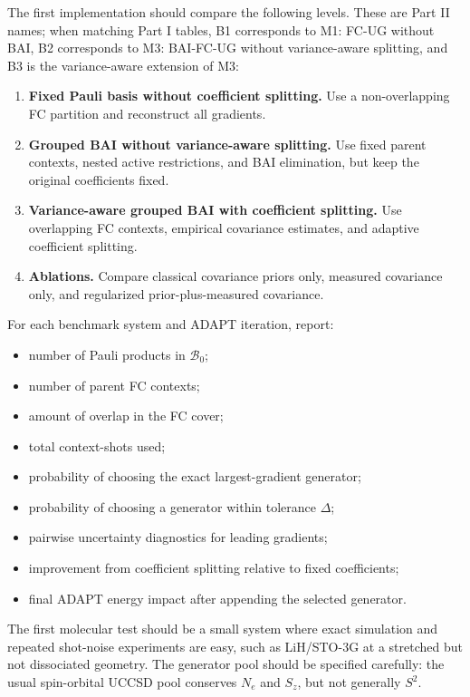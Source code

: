\documentclass[11pt]{article}
\begin{document}
The first implementation should compare the following levels. These are Part II names; when matching Part I tables, B1 corresponds to M1: FC-UG without BAI, B2 corresponds to M3: BAI-FC-UG without variance-aware splitting, and B3 is the variance-aware extension of M3:
\begin{enumerate}[label=\textbf{B\arabic*.}]
    \item \textbf{Fixed Pauli basis without coefficient splitting.} Use a non-overlapping FC partition and reconstruct all gradients.
    \item \textbf{Grouped BAI without variance-aware splitting.} Use fixed parent contexts, nested active restrictions, and BAI elimination, but keep the original coefficients fixed.
    \item \textbf{Variance-aware grouped BAI with coefficient splitting.} Use overlapping FC contexts, empirical covariance estimates, and adaptive coefficient splitting.
    \item \textbf{Ablations.} Compare classical covariance priors only, measured covariance only, and regularized prior-plus-measured covariance.
\end{enumerate}

For each benchmark system and ADAPT iteration, report:
\begin{itemize}[leftmargin=2em]
    \item number of Pauli products in $\mathcal B_0$;
    \item number of parent FC contexts;
    \item amount of overlap in the FC cover;
    \item total context-shots used;
    \item probability of choosing the exact largest-gradient generator;
    \item probability of choosing a generator within tolerance $\Delta$;
    \item pairwise uncertainty diagnostics for leading gradients;
    \item improvement from coefficient splitting relative to fixed coefficients;
    \item final ADAPT energy impact after appending the selected generator.
\end{itemize}

The first molecular test should be a small system where exact simulation and repeated shot-noise experiments are easy, such as LiH/STO-3G at a stretched but not dissociated geometry. The generator pool should be specified carefully: the usual spin-orbital UCCSD pool conserves $N_e$ and $S_z$, but not generally $S^2$.
\end{document}

